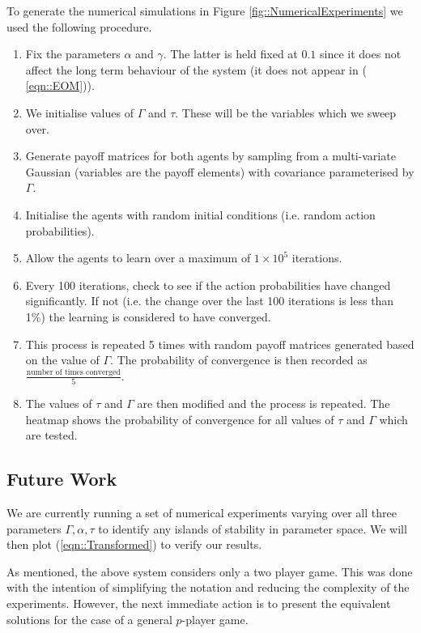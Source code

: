 \documentclass[.../main.tex]{subfiles}
\begin{document}
   To generate the numerical simulations in Figure \ref{fig::NumericalExperiments} we used the
   following procedure.

\begin{enumerate}
    \item Fix the parameters $\alpha$ and $\gamma$. The latter is held fixed at $0.1$ since
    it does not affect the long term behaviour of the system (it does not appear in (
    \ref{eqn::EOM})).
    \item We initialise values of $\Gamma$ and $\tau$. These will be the variables which we sweep
    over.
    \item Generate payoff matrices for both agents by sampling from a multi-variate Gaussian 
    (variables are the payoff elements) with covariance parameterised by $\Gamma$.
    \item Initialise the agents with random initial conditions (i.e. random action probabilities).
    \item Allow the agents to learn over a maximum of $1 \times 10^5$ iterations.
    \item Every 100 iterations, check to see if the action probabilities have changed significantly.
    If not (i.e. the change over the last 100 iterations is less than 1\%) the learning is
    considered to have converged.
    \item This process is repeated 5 times with random payoff matrices generated based on the value
    of $\Gamma$. The probability of convergence is then recorded as $\frac{\text{number of times
    converged}}{5}$.
    \item The values of $\tau$ and $\Gamma$ are then modified and the process is repeated. The
    heatmap shows the probability of convergence for all values of $\tau$ and $\Gamma$ which are
    tested.
\end{enumerate}


    \subsection*{Future Work} \label{sec::Future Work}

    We are currently running a set of numerical experiments varying over all three parameters
    $\Gamma, \alpha, \tau$ to identify any islands of stability in parameter space. We will then
    plot (\ref{eqn::Transformed}) to verify our results.

    As mentioned, the above system considers only a two player game. This was done with the intention
    of simplifying the notation and reducing the complexity of the experiments. However, the next
    immediate action is to present the equivalent solutions for the case of a general $p$-player
    game.
    
\end{document}
